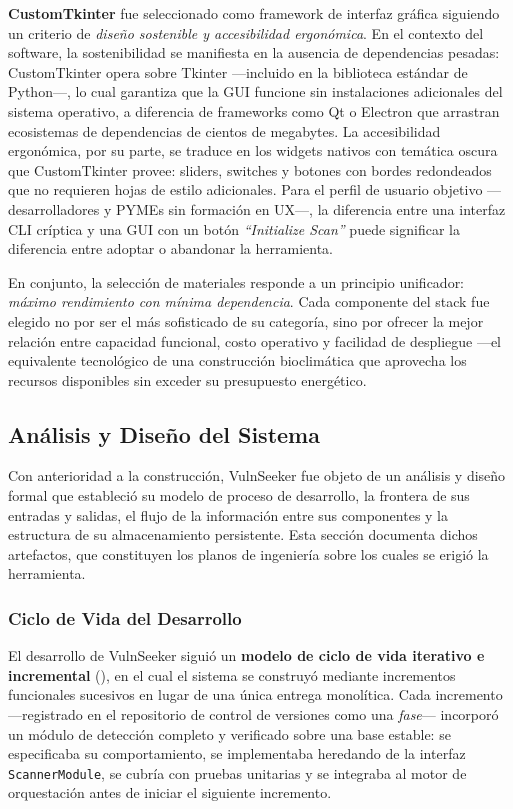 \documentclass[12pt, a4paper]{article}
\begin{document}
\textbf{CustomTkinter} fue seleccionado como framework de interfaz gráfica
siguiendo un criterio de \textit{diseño sostenible y accesibilidad
ergonómica}. En el contexto del software, la sostenibilidad se manifiesta en
la ausencia de dependencias pesadas: CustomTkinter opera sobre Tkinter
---incluido en la biblioteca estándar de Python---, lo cual garantiza que la
GUI funcione sin instalaciones adicionales del sistema operativo, a diferencia
de frameworks como Qt o Electron que arrastran ecosistemas de dependencias de
cientos de megabytes. La accesibilidad ergonómica, por su parte, se traduce en
los widgets nativos con temática oscura que CustomTkinter provee: sliders,
switches y botones con bordes redondeados que no requieren hojas de estilo
adicionales. Para el perfil de usuario objetivo ---desarrolladores y PYMEs sin
formación en UX---, la diferencia entre una interfaz CLI críptica y una GUI
con un botón \textit{``Initialize Scan''} puede significar la diferencia entre
adoptar o abandonar la herramienta.

En conjunto, la selección de materiales responde a un principio unificador:
\textit{máximo rendimiento con mínima dependencia}. Cada componente del stack
fue elegido no por ser el más sofisticado de su categoría, sino por ofrecer la
mejor relación entre capacidad funcional, costo operativo y facilidad de
despliegue ---el equivalente tecnológico de una construcción bioclimática que
aprovecha los recursos disponibles sin exceder su presupuesto energético.

\subsection{Análisis y Diseño del Sistema}

Con anterioridad a la construcción, VulnSeeker fue objeto de un análisis y diseño
formal que estableció su modelo de proceso de desarrollo, la frontera de sus
entradas y salidas, el flujo de la información entre sus componentes y la
estructura de su almacenamiento persistente. Esta sección documenta dichos
artefactos, que constituyen los planos de ingeniería sobre los cuales se erigió
la herramienta.

\subsubsection{Ciclo de Vida del Desarrollo}

El desarrollo de VulnSeeker siguió un \textbf{modelo de ciclo de vida iterativo e
incremental} (\cite{sommerville2011}), en el cual el sistema se construyó mediante
incrementos funcionales sucesivos en lugar de una única entrega monolítica. Cada
incremento ---registrado en el repositorio de control de versiones como una
\textit{fase}--- incorporó un módulo de detección completo y verificado sobre una
base estable: se especificaba su comportamiento, se implementaba heredando de la
interfaz \texttt{ScannerModule}, se cubría con pruebas unitarias y se integraba al
motor de orquestación antes de iniciar el siguiente incremento.
\end{document}
